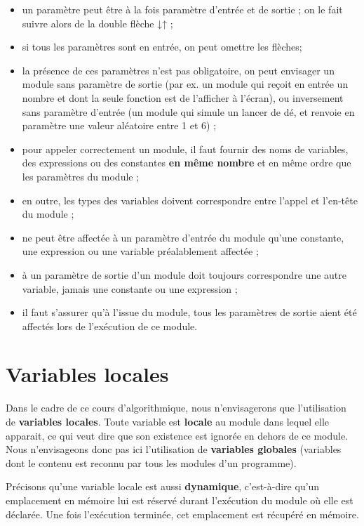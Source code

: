 	\begin{itemize}
	\item {
	{un paramètre peut être à la fois paramètre
	d’entrée et de sortie ; on le fait suivre alors de la double flèche
	}{↓↑}{ ;}}
	\item {
	si tous les paramètres sont en entrée, on peut omettre les flèches;}
	\item {
	la présence de ces paramètres n’est pas obligatoire, on peut envisager
	un module sans paramètre de sortie (par ex. un module qui reçoit en
	entrée un nombre et dont la seule fonction est de l’afficher à
	l’écran), ou inversement sans paramètre d’entrée (un module qui simule
	un lancer de dé, et renvoie en paramètre une valeur aléatoire entre 1
	et 6) ;}
	\item {
	{pour appeler correctement un module, il faut
	fournir des noms de variables, des expressions ou des constantes
	}{\textbf{en même
	nombre}}{ et en même ordre que les paramètres
	du module ;}}
	\item {
	en outre, les types des variables doivent correspondre entre l’appel et
	l’en-tête du module ;}
	\item {
	ne peut être affectée à un paramètre d’entrée du module qu’une
	constante, une expression ou une variable préalablement affectée ;}
	\item {
	à un paramètre de sortie d’un module doit toujours correspondre une
	autre variable, jamais une constante ou une expression ;}
	\item {
	il faut s’assurer qu’à l’issue du module, tous les paramètres de sortie
	aient été affectés lors de l’exécution de ce module.}
	\end{itemize}

\section[Variables locales]{\bfseries Variables locales}
{
{Dans le cadre de ce cours d’algorithmique, nous
n’envisagerons que l’utilisation de
}{\textbf{variables
locales}}{. Toute variable est
}{\textbf{locale}}{ au
module dans lequel elle apparait, ce qui veut dire que son existence
est ignorée en dehors de ce module. Nous n’envisageons donc pas ici
l’utilisation de }{\textbf{variables
globales}}{ (variables dont le contenu est
reconnu par tous les modules d’un programme). }}

{
Précisons qu'une variable locale est aussi
\textbf{dynamique}, c’est-à-dire qu’un emplacement en mémoire lui est
réservé durant l’exécution du module où elle est déclarée. Une fois
l’exécution terminée, cet emplacement est récupéré en mémoire.}

